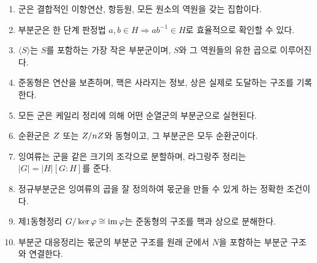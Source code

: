 \begin{chapterreview}
\begin{enumerate}[label=\arabic*.]
  \item 군은 결합적인 이항연산, 항등원, 모든 원소의 역원을 갖는 집합이다.
  \item 부분군은 한 단계 판정법 $a,b\in H\Rightarrow ab^{-1}\in H$로 효율적으로 확인할 수 있다.
  \item $\langle S\rangle$는 $S$를 포함하는 가장 작은 부분군이며, $S$와 그 역원들의 유한 곱으로 이루어진다.
  \item 준동형은 연산을 보존하며, 핵은 사라지는 정보, 상은 실제로 도달하는 구조를 기록한다.
  \item 모든 군은 케일리 정리에 의해 어떤 순열군의 부분군으로 실현된다.
  \item 순환군은 $Z$ 또는 $Z/nZ$와 동형이고, 그 부분군은 모두 순환군이다.
  \item 잉여류는 군을 같은 크기의 조각으로 분할하며, 라그랑주 정리는 $|G|=|H|[G:H]$를 준다.
  \item 정규부분군은 잉여류의 곱을 잘 정의하여 몫군을 만들 수 있게 하는 정확한 조건이다.
  \item 제1동형정리 $G/\ker\varphi\cong\operatorname{im}\varphi$는 준동형의 구조를 핵과 상으로 분해한다.
  \item 부분군 대응정리는 몫군의 부분군 구조를 원래 군에서 $N$을 포함하는 부분군 구조와 연결한다.
\end{enumerate}
\end{chapterreview}
